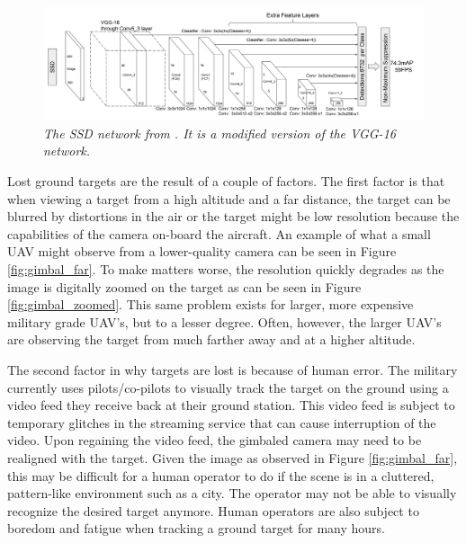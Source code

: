 \documentclass[letterpaper, 10 pt, conference]{ieeeconf}  %
\begin{document}
\begin{figure}
	\begin{center}
		\includegraphics[width=.95\textwidth]{ssd.png}
		\caption{\textit{The SSD network from \cite{liu2016ssd}. It is a modified version of the VGG-16 network.}} 
		\label{fig:ssd}
	\end{center}
\end{figure}

Lost ground targets are the result of a couple of factors. The first factor is that when viewing a target from a high altitude and a far distance, the target can be blurred by distortions in the air or the target might be low resolution because the capabilities of the camera on-board the aircraft. An example of what a small UAV might observe from a lower-quality camera can be seen in Figure \ref{fig:gimbal_far}. To make matters worse, the resolution quickly degrades as the image is digitally zoomed on the target as can be seen in Figure \ref{fig:gimbal_zoomed}. This same problem exists for larger, more expensive military grade UAV's, but to a lesser degree. Often, however, the larger UAV's are observing the target from much farther away and at a higher altitude.

The second factor in why targets are lost is because of human error. The military currently uses pilots/co-pilots to visually track the target on the ground using a video feed they receive back at their ground station. This video feed is subject to temporary glitches in the streaming service that can cause interruption of the video. Upon regaining the video feed, the gimbaled camera may need to be realigned with the target. Given the image as observed in Figure \ref{fig:gimbal_far}, this may be difficult for a human operator to do if the scene is in a cluttered, pattern-like environment such as a city. The operator may not be able to visually recognize the desired target anymore. Human operators are also subject to boredom and fatigue when tracking a ground target for many hours. 
\end{document}
